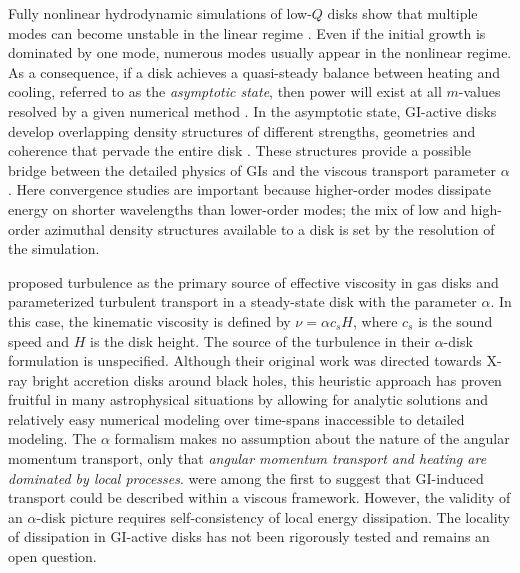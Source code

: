 \documentclass[manuscript]{aastex}
\begin{document}
Fully nonlinear hydrodynamic simulations of low-$Q$ disks show that multiple
modes can become unstable in the linear regime \citep{nelson1998, pickett1998, lodato2004,boley2006,cossins2009}.  Even if the initial growth is dominated by one mode, numerous modes usually appear in the nonlinear regime. As a consequence, if a disk achieves a quasi-steady balance between heating and cooling, referred to as the {\it asymptotic state},
then power will exist at all $m$-values resolved by a given numerical method \citep{mejia2005,boley2006}.  
In the asymptotic state, GI-active disks develop overlapping density structures of different strengths, geometries and coherence that pervade the entire disk \citep[e.g.,][]{pickett2003, mejia2005,boley2006}.
These structures provide a possible bridge between the detailed physics of GIs and the viscous transport parameter $\alpha$
\citep{gammie2001}.  Here convergence studies are important because 
higher-order modes dissipate energy on shorter wavelengths than lower-order modes; the mix of low and high-order azimuthal density structures
available to a disk is set by the resolution of the simulation.

\citet{shakura1973} proposed turbulence as the primary source of effective viscosity in gas disks
and parameterized turbulent transport in a steady-state disk with the  parameter $\alpha$.  In this case,  the kinematic
viscosity is defined by $\nu = \alpha c_s H$, where  $c_s$ is the sound speed and $H$ is the disk height.
The source of the 
turbulence in their $\alpha$-disk formulation is unspecified. Although their original work was directed towards X-ray bright
accretion disks around black holes, this heuristic approach has proven fruitful in many astrophysical situations by allowing for analytic solutions and relatively easy numerical modeling over time-spans inaccessible to detailed modeling. 
The $\alpha$ formalism makes no assumption about the nature of the angular momentum transport, only that {\it angular momentum transport
and heating are dominated by local processes}. \citet{lin1987,lin1990} were among the first to suggest
that GI-induced transport could be described within a viscous
framework.  However, the  validity of an $\alpha$-disk picture requires self-consistency of local energy dissipation. 
The locality of dissipation in GI-active disks has not been rigorously tested and remains an open question. 
\end{document}
